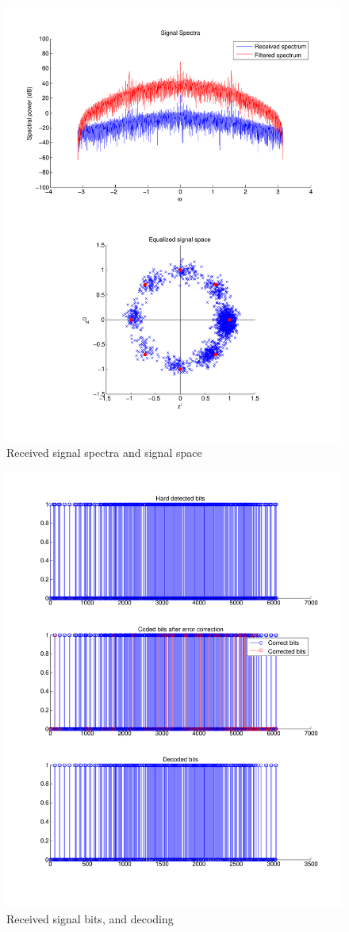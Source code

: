 \documentclass[11pt]{scrartcl}
\begin{document}
\begin{figure}
    \centering
    \includegraphics[width=1.0\textwidth]{figures/receivedspectra.pdf}
    \caption{Received signal spectra and signal space}
\end{figure}

\begin{figure}
    \centering
    \includegraphics[width=1.0\textwidth]{figures/receivedbits.pdf}
    \caption{Received signal bits, and decoding}
\end{figure}
\end{document}
